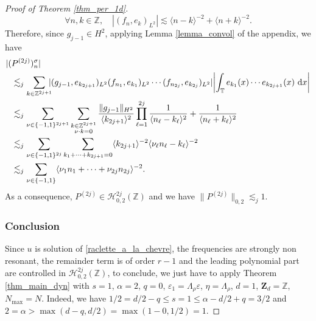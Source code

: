 \begin{proof}[Proof of Theorem \ref{thm_per_1d}]
\[
\forall n,k\in \mathbb{Z}, \quad |(f_n,e_k)_{L^2}| \lesssim \langle n-k \rangle^{-2} + \langle n+k \rangle^{-2}.
\]
Therefore, since $g_{j-1}\in H^2$, applying Lemma \ref{lemma_convol} of the appendix, we have
\begin{equation*}
\begin{split}
|(&P^{(2j)})_n^\sigma| \\
&\lesssim_j \sum_{k\in \mathbb{Z}^{2j+1}}\hspace*{-2mm} | (g_{j-1},e_{k_{2j+1}})_{L^2} (f_{n_1},e_{k_1})_{L^2} \cdots (f_{n_{2j}},e_{k_{2j}})_{L^2}| \biggl| \int_{\mathbb{T}} e_{k_1}(x) \cdots e_{k_{2j+1}}(x) \ \mathrm{d}x \biggr| \\
&\lesssim_j \sum_{\nu \in \{-1,1\}^{2j+1}} \sum_{\substack{k\in \mathbb{Z}^{2j+1}\\ \nu \cdot k =0}} \frac{\| g_{j-1} \|_{H^2}}{\langle k_{2j+1} \rangle^2} \prod_{\ell=1}^{2j} \frac1{\langle n_{\ell}-k_{\ell} \rangle^2} + \frac1{\langle n_{\ell}+k_{\ell} \rangle^2} \\
&\lesssim_j \sum_{\nu \in \{-1,1\}^{2j}} \sum_{k_1+\cdots+k_{2j+1}=0} \langle k_{2j+1} \rangle^{-2} \langle \nu_\ell n_{\ell}-k_{\ell} \rangle^{-2} \\
&\lesssim_j \sum_{\nu \in \{-1,1\}} \langle \nu_1 n_1 + \cdots+ \nu_{2j} n_{2j} \rangle^{-2}.
\end{split}
\end{equation*}
As a consequence, $P^{(2j)} \in \mathscr{H}_{0,2}^{2j}(\mathbb{Z})$ and we have $\| P^{(2j)} \|_{0,2} \lesssim_j 1$.

\subsubsection*{Conclusion}
Since $u$ is solution of \eqref{raclette_a_la_chevre}, the frequencies are strongly non resonant, the remainder term is of order $r-1$ and the leading polynomial part are controlled in $\mathscr{H}_{0,2}^{2j}(\mathbb{Z})$, to conclude, we just have to apply Theorem \ref{thm_main_dyn} with $s=1$, $\alpha =2$, $q=0$, $\varepsilon_1 = \Lambda_\rho \varepsilon$, $\eta= \Lambda_{\rho}$, $d=1$, $\mathbf{Z}_d=\mathbb{Z}$, $N_{\max}=N$. Indeed, we have $1/2=d/2-q \leq s=1 \leq \alpha - d/2 +q =3/2 $ and $2=\alpha > \max(d-q,d/2) =\max(1-0,1/2)=1$.
\end{proof}

